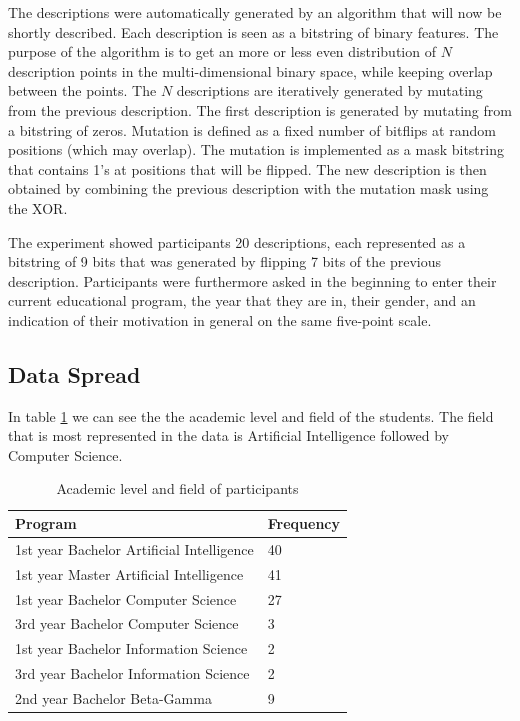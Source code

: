 \documentclass[11pt]{article}
\newcommand{\ra}[1]{\renewcommand{\arraystretch}{#1}}
\begin{document}
The descriptions were automatically generated by an algorithm that will now be shortly described. Each description is seen as a bitstring of binary features. The purpose of the algorithm is to get an more or less even distribution of $N$ description points in the multi-dimensional binary space, while keeping overlap between the points. The $N$ descriptions are iteratively generated by mutating from the previous description. The first description is generated by mutating from a bitstring of zeros. Mutation is defined as a fixed number of bitflips at random positions (which may overlap). The mutation is implemented as a mask bitstring that contains 1's at positions that will be flipped. The new description is then obtained by combining the previous description with the mutation mask using the XOR.

The experiment showed participants 20 descriptions, each represented as a bitstring of 9 bits that was generated by flipping 7 bits of the previous description. Participants were furthermore asked in the beginning to enter their current educational program, the year that they are in, their gender, and an indication of their motivation in general on the same five-point scale.

\subsection{Data Spread}
In table \ref{tab:level} we can see the the academic level and field of the students. The field that is most represented in the data is Artificial Intelligence followed by Computer Science.
\begin{table}[h!t]
  \centering
  \ra{1.3}
\footnotesize
  \begin{tabular}{@{}ll@{}}
  \toprule
  Program & Frequency \\ 
  \midrule
  1st year Bachelor Artificial Intelligence & 40 \\
  1st year Master Artificial Intelligence & 41 \\
  1st year Bachelor Computer Science & 27 \\
  3rd year Bachelor Computer Science & 3 \\
  1st year Bachelor Information Science & 2 \\
  3rd year Bachelor Information Science & 2 \\
  2nd year Bachelor Beta-Gamma & 9 \\
  \bottomrule
  \end{tabular}
  \caption{Academic level and field of participants}
\label{tab:level}
\end{table}
\end{document}
